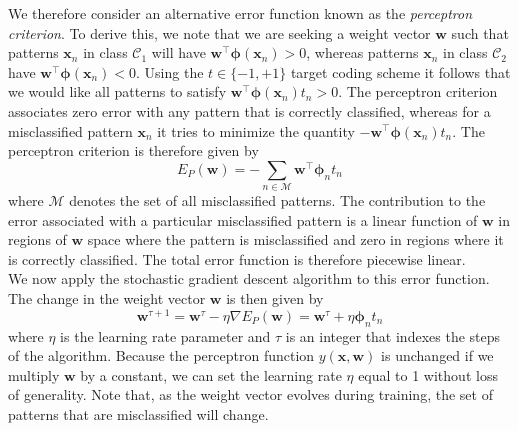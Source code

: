 \documentclass[twoside]{article}
\begin{document}
We therefore consider an alternative error function known as the \textit{perceptron criterion}. To derive this, we note that we are seeking a weight vector $\boldsymbol{w}$ such that patterns $\boldsymbol{x}_n$ in class $\mathcal{C}_1$ will have $\boldsymbol{w}^\intercal\boldsymbol{\phi}(\boldsymbol{x}_n) > 0$, whereas patterns $\boldsymbol{x}_n$ in class $\mathcal{C}_2$ have $\boldsymbol{w}^\intercal\boldsymbol{\phi}(\boldsymbol{x}_n) < 0$. Using the $t \in \{-1,+1\}$ target coding scheme it follows that we would like all patterns to satisfy $\boldsymbol{w}^\intercal\boldsymbol{\phi}(\boldsymbol{x}_n)t_n > 0$. The perceptron criterion associates zero error with any pattern that is correctly classified, whereas for a misclassified pattern $\boldsymbol{x}_n$ it tries to minimize the quantity $-\boldsymbol{w}^\intercal\boldsymbol{\phi}(\boldsymbol{x}_n)t_n$. The perceptron criterion is therefore given by
\begin{equation*}
    E_P(\boldsymbol{w}) = - \sum\limits_{n \in \mathcal{M}}\boldsymbol{w}^\intercal
    \boldsymbol{\phi}_nt_n
\end{equation*}
where $\mathcal{M}$ denotes the set of all misclassified patterns. The contribution to the error associated with a particular misclassified pattern is a linear function of $\boldsymbol{w}$ in regions of $\boldsymbol{w}$ space where the pattern is misclassified and zero in regions where it is correctly classified. The total error function is therefore piecewise linear.\\
We now apply the stochastic gradient descent algorithm to this error function. The change in the weight vector $\boldsymbol{w}$ is then given by
\begin{equation}
    \boldsymbol{w}^{\tau + 1} = \boldsymbol{w}^\tau - \eta \nabla E_P(\boldsymbol{w}) = \boldsymbol{w}^\tau + \eta\boldsymbol{\phi}_nt_n
\end{equation}
where $\eta$ is the learning rate parameter and $\tau$ is an integer that indexes the steps of the algorithm. Because the perceptron function $y(\boldsymbol{x}, \boldsymbol{w})$ is unchanged if we multiply $\boldsymbol{w}$ by a constant, we can set the learning rate $\eta$ equal to 1 without loss of generality. Note that, as the weight vector evolves during training, the set of patterns that are misclassified will change.\medskip
\end{document}
